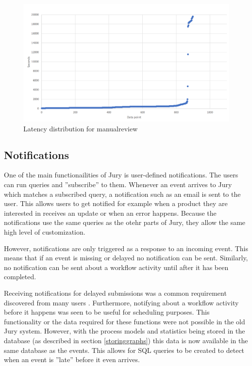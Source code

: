 \begin{figure}[htb]
    \centering \includegraphics[width=0.6\linewidth]{gfx/manualreview.png}
    \caption{Latency distribution for manualreview }
    \label{fig:manualreview}
\end{figure}

\subsection{Notifications}
\label{sec:notifications}

One of the main functionailities of Jury is user-defined notifications.
The users can run queries and ''subscribe'' to them.
Whenever an event arrives to Jury which matches a subscribed query, a notification such as an email is sent to the user.
This allows users to get notified for example when a product they are interested in receives an update or when an error happens.
Because the notifications use the same queries as the otehr parts of Jury, they allow the same high level of customization.

However, notifications are only triggered as a response to an incoming event.
This means that if an event is missing or delayed no notification can be sent.
Similarly, no notification can be sent about a workflow activity until after it has been completed.

Receiving notifications for delayed submissions was a common requirement discovered from many users .
Furthermore, notifying about a workflow activity before it happens was seen to be useful for scheduling purposes.
This functionality or the data required for these functions were not possible in the old Jury system.
However, with the process models and statistics being stored in the database (as described in section \ref{storinggraphs}) this data is now available in the same database as the events.
This allows for SQL queries to be created to detect when an event is ''late'' before it even arrives.

